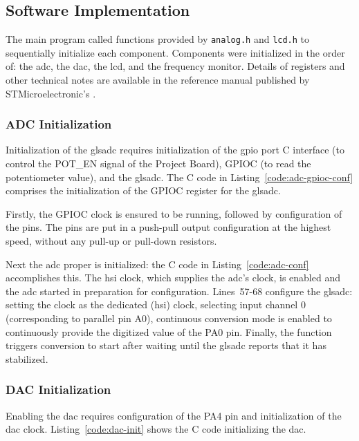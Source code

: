 \subsection{Software Implementation}
The main program called functions provided by \lstinline{analog.h} and
\lstinline{lcd.h} to sequentially initialize each component. Components
were initialized in the order of: the \gls{adc}, the \gls{dac}, the
\gls{lcd}, and the frequency monitor. Details of registers and other
technical notes are available in the reference manual published by
STMicroelectronic's \cite{ref}.


\subsubsection{ADC Initialization}
Initialization of the gls{adc} requires initialization of the \gls{gpio}
port C interface (to control the POT\_EN signal of the Project Board),
GPIOC (to read the potentiometer value), and the gls{adc}. The C code in
Listing~\ref{code:adc-gpioc-conf} comprises the initialization of the
GPIOC register for the gls{adc}.


Firstly, the GPIOC clock is ensured to be running, followed by
configuration of the pins. The pins are put in a push-pull output
configuration at the highest speed, without any pull-up or pull-down
resistors.


Next the \gls{adc} proper is initialized: the C code in
Listing~\ref{code:adc-conf} accomplishes this.  The \gls{hsi} clock, which
supplies the \gls{adc}'s clock, is enabled and the \gls{adc} started in preparation
for configuration. Lines~57-68 configure the gls{adc}: setting the clock as
the dedicated (\gls{hsi}) clock, selecting input channel 0 (corresponding to
parallel pin A0), continuous conversion mode is enabled to continuously
provide the digitized value of the PA0 pin. Finally, the function
triggers conversion to start after waiting until the gls{adc} reports that it
has stabilized.

\subsubsection{DAC Initialization}
Enabling the \gls{dac} requires configuration of the PA4 pin and
initialization of the \gls{dac} clock. Listing~\ref{code:dac-init} shows
the C code initializing the \gls{dac}.

